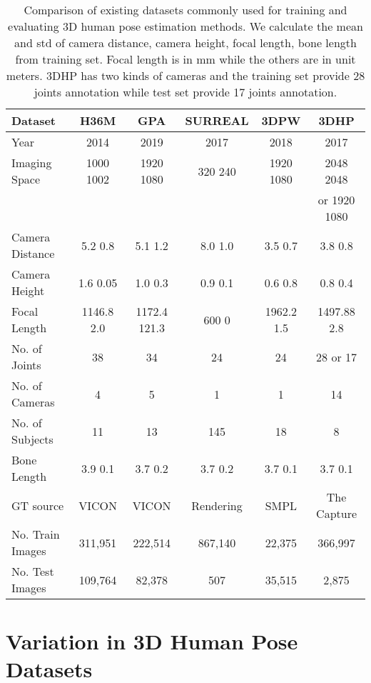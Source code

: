 \documentclass[runningheads]{llncs}
\begin{document}
\begin{table}[t] \centering
\begin{center}
{\scriptsize
\begin{tabular}{@{}l c c c c c@{}}
\toprule
Dataset & H36M & GPA & SURREAL & 3DPW & 3DHP \\
\hline
Year & 2014 & 2019 & 2017 & 2018 & 2017 \\
Imaging Space & 1000  1002 & 1920  1080 & 320  240 & 1920  1080 & 2048  2048 \\ 
 &   &   &   &  & or 1920  1080 \\ 
Camera Distance & 5.2  0.8 & 5.1  1.2 & 8.0  1.0 & 3.5  0.7 & 3.8  0.8 \\
Camera Height & 1.6  0.05 & 1.0  0.3 & 0.9  0.1 & 0.6  0.8 & 0.8  0.4 \\
Focal Length& 1146.8  2.0 & 1172.4  121.3 & 600  0 & 1962.2  1.5 & 1497.88  2.8 \\
No. of Joints & 38 & 34 & 24 & 24 & 28 or 17 \\
No. of Cameras & 4 & 5 & 1 & 1 & 14 \\
No. of Subjects & 11 & 13 & 145 & 18 & 8 \\
Bone Length & 3.9  0.1 & 3.7  0.2 & 3.7  0.2 & 3.7  0.1 & 3.7  0.1 \\
GT source &VICON & VICON & Rendering &  SMPL & The Capture \\
No. Train Images & 311,951 & 222,514 &   867,140 & 22,375 & 366,997 \\
No. Test Images  & 109,764 & 82,378 & 507 & 35,515 &  2,875\\
\bottomrule
\end{tabular}
}
\end{center}

\caption{Comparison of existing datasets commonly used for training and
evaluating 3D human pose estimation methods. We calculate the mean and std of
camera distance, camera height, focal length, bone length from training set.
Focal length is in mm while the others are in unit meters. 
3DHP has two kinds of cameras and the training set
provide 28 joints annotation while test set provide 17 joints annotation.}
\label{table:datasets}
\vspace{-0.15in}
\end{table}

\section{Variation in 3D Human Pose Datasets}
\label{sec:datasetanalysis}
\end{document}
